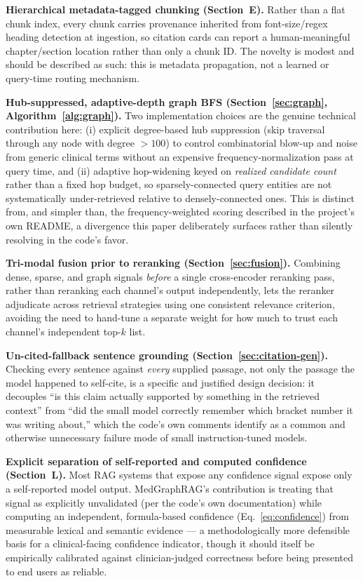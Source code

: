 \documentclass[conference]{IEEEtran}
\begin{document}
\textbf{Hierarchical metadata-tagged chunking (Section~E).} Rather than a flat chunk index, every chunk carries provenance inherited from font-size/regex heading detection at ingestion, so citation cards can report a human-meaningful chapter/section location rather than only a chunk ID. The novelty is modest and should be described as such: this is metadata propagation, not a learned or query-time routing mechanism.

\textbf{Hub-suppressed, adaptive-depth graph BFS (Section~\ref{sec:graph}, Algorithm~\ref{alg:graph}).} Two implementation choices are the genuine technical contribution here: (i) explicit degree-based hub suppression (skip traversal through any node with degree $>100$) to control combinatorial blow-up and noise from generic clinical terms without an expensive frequency-normalization pass at query time, and (ii) adaptive hop-widening keyed on \emph{realized candidate count} rather than a fixed hop budget, so sparsely-connected query entities are not systematically under-retrieved relative to densely-connected ones. This is distinct from, and simpler than, the frequency-weighted scoring described in the project's own README, a divergence this paper deliberately surfaces rather than silently resolving in the code's favor.

\textbf{Tri-modal fusion prior to reranking (Section~\ref{sec:fusion}).} Combining dense, sparse, and graph signals \emph{before} a single cross-encoder reranking pass, rather than reranking each channel's output independently, lets the reranker adjudicate across retrieval strategies using one consistent relevance criterion, avoiding the need to hand-tune a separate weight for how much to trust each channel's independent top-$k$ list.

\textbf{Un-cited-fallback sentence grounding (Section~\ref{sec:citation-gen}).} Checking every sentence against \emph{every} supplied passage, not only the passage the model happened to self-cite, is a specific and justified design decision: it decouples ``is this claim actually supported by something in the retrieved context'' from ``did the small model correctly remember which bracket number it was writing about,'' which the code's own comments identify as a common and otherwise unnecessary failure mode of small instruction-tuned models.

\textbf{Explicit separation of self-reported and computed confidence (Section~L).} Most RAG systems that expose any confidence signal expose only a self-reported model output. MedGraphRAG's contribution is treating that signal as explicitly unvalidated (per the code's own documentation) while computing an independent, formula-based confidence (Eq.~\ref{eq:confidence}) from measurable lexical and semantic evidence — a methodologically more defensible basis for a clinical-facing confidence indicator, though it should itself be empirically calibrated against clinician-judged correctness before being presented to end users as reliable.
\end{document}
